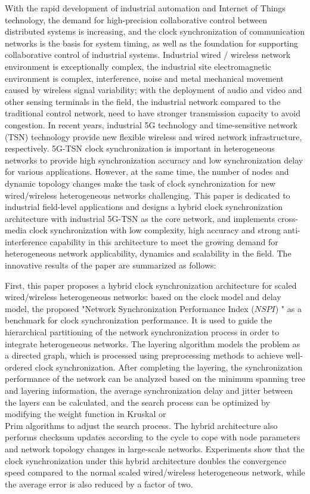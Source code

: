\documentclass[UTF8,a4paper,12pt]{ctexart}
\numberwithin{equation}{section}
\begin{document}
	With the rapid development of industrial automation and Internet of Things technology, the demand for high-precision collaborative control between distributed systems is increasing, and the clock synchronization of communication networks is the basis for system timing, as well as the foundation for supporting collaborative control of industrial systems. Industrial wired / wireless network environment is exceptionally complex, the industrial site electromagnetic environment is complex, interference, noise and metal mechanical movement caused by wireless signal variability; with the deployment of audio and video and other sensing terminals in the field, the industrial network compared to the traditional control network, need to have stronger transmission capacity to avoid congestion. In recent years, industrial 5G technology and time-sensitive network (TSN) technology provide new flexible wireless and wired network infrastructure, respectively. 5G-TSN clock synchronization is important in heterogeneous networks to provide high synchronization accuracy and low synchronization delay for various applications. However, at the same time, the number of nodes and dynamic topology changes make the task of clock synchronization for new wired/wireless heterogeneous networks challenging. This paper is dedicated to industrial field-level applications and designs a hybrid clock synchronization architecture with industrial 5G-TSN as the core network, and implements cross-media clock synchronization with low complexity, high accuracy and strong anti-interference capability in this architecture to meet the growing demand for heterogeneous network applicability, dynamics and scalability in the field. The innovative results of the paper are summarized as follows:
	
	First, this paper proposes a hybrid clock synchronization architecture for scaled wired/wireless heterogeneous networks: based on the clock model and delay model, the proposed "Network Synchronization Performance Index ($NSPI$) " as a benchmark for clock synchronization performance. It is used to guide the hierarchical partitioning of the network synchronization process in order to integrate heterogeneous networks. The layering algorithm models the problem as a directed graph, which is processed using preprocessing methods to achieve well-ordered clock synchronization. After completing the layering, the synchronization performance of the network can be analyzed based on the minimum spanning tree and layering information, the average synchronization delay and jitter between the layers can be calculated, and the search process can be optimized by modifying the weight function in Kruskal or \\Prim algorithms to adjust the search process. The hybrid architecture also performs checksum updates according to the cycle to cope with node parameters and network topology changes in large-scale networks. Experiments show that the clock synchronization under this hybrid architecture doubles the convergence speed compared to the normal scaled wired/wireless heterogeneous network, while the average error is also reduced by a factor of two.
	
\end{document}
